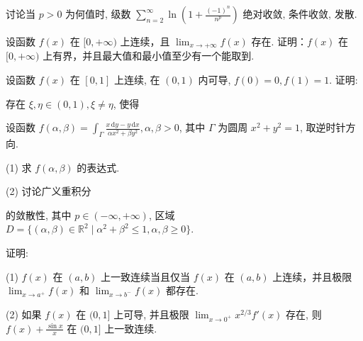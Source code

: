 \par{}
讨论当 $p > 0$ 为何值时, 级数 $\sum_{n=2}^{\infty} \ln \left(1 + \frac{(-1)^n}{n^p}\right)$ 绝对收敛, 条件收敛, 发散.\par
\par{}
设函数 $f(x)$ 在 $[0, +\infty)$ 上连续，且 $\lim_{x \to +\infty} f(x)$ 存在. 证明：$f(x)$ 在 $[0, +\infty)$ 上有界，并且最大值和最小值至少有一个能取到.\par
\par{}
设函数 $f(x)$ 在 $[0,1]$ 上连续, 在 $(0,1)$ 内可导, $f(0)=0,f(1)=1$. 证明:\par
\par{}
存在 $\xi,\eta\in(0,1),\xi\ne\eta$, 使得\par
\nopagebreak[4]
\par{}
设函数 $f(\alpha, \beta) = \int_{\Gamma} \frac{x \, \mathrm{d}y - y \, \mathrm{d}x}{\alpha x^2 + \beta y^2}, \alpha, \beta > 0$, 其中 $\Gamma$ 为圆周 $x^2 + y^2 = 1$, 取逆时针方向.\par
(1) 求 $f(\alpha, \beta)$ 的表达式.\par
\par{}
(2) 讨论广义重积分\par
\nopagebreak[4]
的敛散性, 其中 $p \in (-\infty, +\infty)$, 区域 $D = \{(\alpha, \beta) \in \mathbb{R}^2 \mid \alpha^2 + \beta^2 \leq 1, \alpha, \beta \geq 0\}$.\par
\par{}
证明:\par
(1) $f(x)$ 在 $(a, b)$ 上一致连续当且仅当 $f(x)$ 在 $(a, b)$ 上连续，并且极限 $\lim_{x \to a^{+}} f(x)$ 和 $\lim_{x \to b^{-}} f(x)$ 都存在.\par
(2) 如果 $f(x)$ 在 $(0,1]$ 上可导, 并且极限 $\lim_{x\to 0^{+}}x^{2 / 3}f'(x)$ 存在, 则 $f(x) + \frac{\sin x}{x}$ 在 $(0,1]$ 上一致连续.\par
